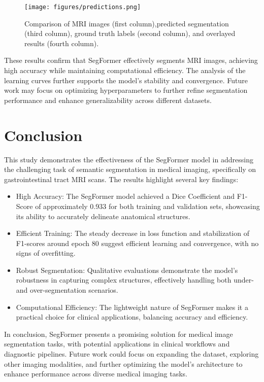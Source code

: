 \documentclass[journal]{IEEEtran}
\begin{document}
\begin{figure}[h]
\centering
\texttt{[image: figures/predictions.png]}
\caption{Comparison of MRI images (first column),predicted segmentation (third column), ground truth labels (second column),  and overlayed results (fourth column).}
\label{fig:predictions}
\end{figure}

These results confirm that SegFormer effectively segments MRI images, achieving high accuracy while maintaining computational efficiency. The analysis of the learning curves further supports the model's stability and convergence. Future work may focus on optimizing hyperparameters to further refine segmentation performance and enhance generalizability across different datasets.

\section{Conclusion}

This study demonstrates the effectiveness of the SegFormer model in addressing the challenging task of semantic segmentation in medical imaging, specifically on gastrointestinal tract MRI scans. The results highlight several key findings:
\begin{itemize}
  \item High Accuracy: The SegFormer model achieved a Dice Coefficient and F1-Score of approximately 0.933 for both training and validation sets, showcasing its ability to accurately delineate anatomical structures.
  \item Efficient Training: The steady decrease in loss function and stabilization of F1-scores around epoch 80 suggest efficient learning and convergence, with no signs of overfitting.
  \item Robust Segmentation: Qualitative evaluations demonstrate the model's robustness in capturing complex structures, effectively handling both under- and over-segmentation scenarios.
  \item Computational Efficiency: The lightweight nature of SegFormer makes it a practical choice for clinical applications, balancing accuracy and efficiency.
\end{itemize}
In conclusion, SegFormer presents a promising solution for medical image segmentation tasks, with potential applications in clinical workflows and diagnostic pipelines. Future work could focus on expanding the dataset, exploring other imaging modalities, and further optimizing the model's architecture to enhance performance across diverse medical imaging tasks.

\ifCLASSOPTIONcaptionsoff
  \newpage
\fi




\end{document}
